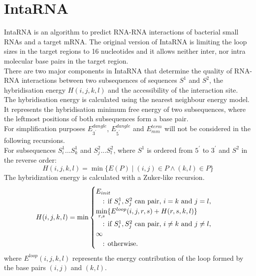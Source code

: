 \documentclass[11pt,a4paper]{report}
\newcommand{\seq}{S} %
\newcommand{\str}{P} %
\begin{document}
\section*{IntaRNA}
IntaRNA is an algorithm to predict RNA-RNA interactions of bacterial small RNAs and a target mRNA. The original version of IntaRNA is limiting the loop sizes in the target regions to 16 nucleotides and it allows neither inter, nor intra molecular base pairs in the target region.\\
There are two major components in IntaRNA that determine the quality of RNA-RNA interactions between two subsequences of sequences $\seq^1$ and $\seq^2$, the hybridisation energy $H(i,j,k,l)$ and the accessibility of the interaction site.\\
The hybridisation energy is calculated using the nearest neighbour energy model. It represents the hybridisation minimum free energy of two subsequences, where the leftmost positions of both subsequences form a base pair.\\
For simplification purposes $E_{3^\prime}^{dangle}$, $E_{5^\prime}^{dangle}$ and $E_{mm}^{term}$ will not be considered in the following recursions.\\
For subsequences  $\seq_{i}^1 ... \seq_{k}^1$ and $\seq_{j}^2 ... \seq_{l}^2$, where $\seq^1$ is ordered from $5^\prime$ to $3^\prime$ and $\seq^2$ in the reverse order:
\begin{equation*}
H(i,j,k,l) = \min\{E(\str)\mid (i,j) \in \str \wedge (k,l) \in \str\}
\end{equation*}
The hybridization energy is calculated with a Zuker-like recursion.\\
\begin{equation*}
H(i,j,k,l) = \min \begin{cases}
					E_{init}\\
    				\quad\text{: if } \seq_{i}^1, \seq_{j}^2\text{ can pair, } i = k \text{ and } j = l,\\
    				\min\limits_{r,s} \{E^{loop}(i,j,r,s) + H(r,s,k,l)\}\\
    				\quad \text{: if } \seq_{i}^1, \seq_{j}^2\text{ can pair, }i\neq k \text{ and } j\neq l,\\
   					\infty\\
   					\quad\text{: otherwise.}\\
				\end{cases}\\
\end{equation*}
where $E^{loop}(i,j,k,l)$ represents the energy contribution of the loop formed by the base pairs $(i,j)$ and $(k,l)$.\\
\end{document}
